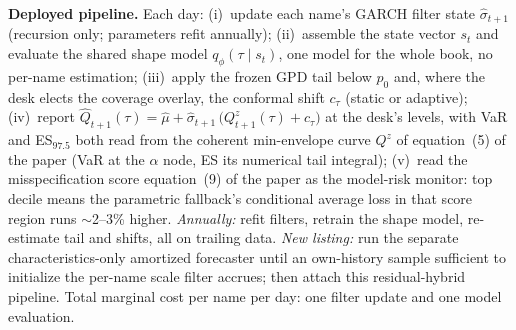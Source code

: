 \documentclass[11pt]{article}
\begin{document}
\medskip\noindent\textbf{Deployed pipeline.} Each day: (i)~update each name's GARCH filter state
$\widehat\sigma_{t+1}$ (recursion only; parameters refit annually);
(ii)~assemble the state vector $s_t$ and evaluate the shared shape model $q_\phi(\tau\mid s_t)$, one model for the whole book, no
per-name estimation; (iii)~apply the frozen GPD tail below $p_0$
and, where the desk elects the coverage overlay, the conformal shift
$c_\tau$ (static or adaptive); (iv)~report
$\widehat Q_{t+1}(\tau) = \widehat\mu+\widehat\sigma_{t+1}\,\big(Q^{z}_{t+1}(\tau)+c_\tau\big)$
at the desk's levels, with VaR and ES$_{97.5}$ both read from the coherent
min-envelope curve $Q^{z}$ of equation~(5) of the paper (VaR at the $\alpha$
node, ES its numerical tail integral); (v)~read
the misspecification score equation~(9) of the paper as the model-risk monitor: top decile means the parametric fallback's conditional average loss
in that score region runs $\sim$2--3\% higher. \emph{Annually:} refit filters, retrain the shape model,
re-estimate tail and shifts, all on trailing data. \emph{New listing:}
run the separate characteristics-only amortized forecaster until an
own-history sample sufficient to initialize the per-name scale filter
accrues; then attach this residual-hybrid pipeline. Total marginal
cost per name per day: one filter update and
one model evaluation.
\end{document}
